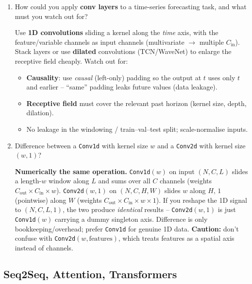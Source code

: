 \documentclass[10pt,a4paper]{article}
\newcommand{\q}[1]{\item #1}
\begin{document}
\begin{enumerate}[leftmargin=*,label=\textbf{Q\arabic*.}]
\q How could you apply \textbf{conv layers} to a time-series forecasting task, and what must you watch out for?
\begin{answerbox}
Use \textbf{1D convolutions} sliding a kernel along the \emph{time} axis, with the feature/variable channels as input channels (multivariate $\to$ multiple $C_{\text{in}}$). Stack layers or use \textbf{dilated} convolutions (TCN/WaveNet) to enlarge the receptive field cheaply. Watch out for:
\begin{itemize}[leftmargin=*,nosep]
  \item \textbf{Causality}: use \emph{causal} (left-only) padding so the output at $t$ uses only $t$ and earlier -- ``same'' padding leaks future values (data leakage).
  \item \textbf{Receptive field} must cover the relevant past horizon (kernel size, depth, dilation).
  \item No leakage in the windowing / train--val--test split; scale-normalise inputs.
\end{itemize}
\end{answerbox}

\q Difference between a \texttt{Conv1d} with kernel size $w$ and a \texttt{Conv2d} with kernel size $(w,1)$?
\begin{answerbox}
\textbf{Numerically the same operation.} \texttt{Conv1d}$(w)$ on input $(N,C,L)$ slides a length-$w$ window along $L$ and sums over all $C$ channels (weights $C_{\text{out}}{\times}C_{\text{in}}{\times}w$). \texttt{Conv2d}$(w,1)$ on $(N,C,H,W)$ slides $w$ along $H$, $1$ (pointwise) along $W$ (weights $C_{\text{out}}{\times}C_{\text{in}}{\times}w{\times}1$). If you reshape the 1D signal to $(N,C,L,1)$, the two produce \emph{identical} results -- \texttt{Conv2d}$(w,1)$ is just \texttt{Conv1d}$(w)$ carrying a dummy singleton axis. Difference is only bookkeeping/overhead; prefer \texttt{Conv1d} for genuine 1D data. \textbf{Caution:} don't confuse with \texttt{Conv2d}$(w,\text{features})$, which treats features as a spatial axis instead of channels.
\end{answerbox}

\end{enumerate}

\subsection{Seq2Seq, Attention, Transformers}
\end{document}

